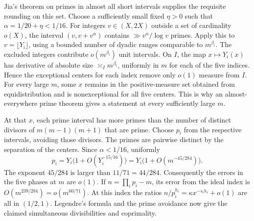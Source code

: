 \documentclass[11pt,a4paper]{article}
\numberwithin{equation}{section}
\begin{document}
Jia's theorem on primes in almost all short intervals
\cite{Jia1996} supplies the requisite rounding on this set.
Choose a sufficiently small fixed $\eta>0$ such that
$\alpha=1/20+\eta<1/16$. For integers $v\in(X,2X)$ outside a set
of cardinality $o(X)$, the interval $(v,v+v^\alpha)$ contains
$\gg v^\alpha/\log v$ primes. Apply this to $v=\lfloor Y_i\rfloor$,
using a bounded number of dyadic ranges comparable to $m^{\beta_i}$.
The excluded integers contribute $o(m^{\beta_i})$ unit intervals.
On $I$, the map $x\mapsto Y_i(x)$ has derivative of absolute size
$\asymp_I m^{\beta_i}$, uniformly in $m$ for each of the five
indices. Hence the exceptional centers for each index remove only
$o(1)$ measure from $I$. For every large $m$, some $x$ remains
in the positive-measure set obtained from equidistribution and is
nonexceptional for all five centers. This is why an almost-everywhere
prime theorem gives a statement at every sufficiently large $m$.

At that $x$, each prime interval has more primes than the number
of distinct divisors of $m(m-1)(m+1)$ that are prime.
Choose $p_i$ from the respective intervals, avoiding those divisors.
The primes are pairwise distinct by the separation of the centers.
Since $\alpha<1/16$, uniformly
\[
 p_i=Y_i\bigl(1+O(Y_i^{-15/16})\bigr)
     =Y_i\bigl(1+O(m^{-45/284})\bigr).
\]
The exponent $45/284$ is larger than $11/71=44/284$.
Consequently the errors in the five phases at $m$ are $o(1)$.
If $n=\prod_i p_i-m$, its error from the ideal index is
$O(m^{239/284})=o(m^{60/71})$. At this index the ratios
$n/p_i^{h_i}=\kappa x^{-s_i h_i}+o(1)$ are all in $(1/2,1)$.
Legendre's formula and the prime avoidance now give the claimed
simultaneous divisibilities and coprimality.
\end{document}
